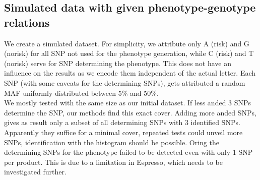 \documentclass[letterpaper, 11pt]{article}
\begin{document}
\subsection{Simulated data with given phenotype-genotype relations}

We create a simulated dataset. For simplicity, we attribute only A (risk) and G (norisk) for all SNP not used for the phenotype generation, while C (risk) and T (norisk) serve for SNP determining the phenotype. This does not have an influence on the results as we encode them independent of the actual letter. Each SNP (with some caveats for  the determining SNPs), gets attributed a random MAF uniformly distributed between 5\% and 50\%. \\

We mostly tested with the same size as our initial dataset. If less anded 3 SNPs determine the SNP, our methods find this exact cover. Adding more anded SNPs, gives as result only a subset of all determining SNPs with 3 identified SNPs. Apparently they suffice for a minimal cover, repeated tests could unveil more SNPs, identification with the histogram should be possible. 
Oring the determining SNPs for the phenotype failed to be detected even with only 1 SNP per product. This is due to a limitation in Espresso, which needs to be investigated further. 
\end{document}
